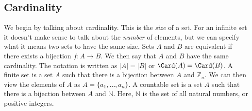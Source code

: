 \documentclass[crop=false,class=book,oneside]{standalone}
\begin{document}
        \subsection{Cardinality}
            We begin by talking about cardinality. This is the
            \textit{size} of a set. For an infinite set it
            doesn't make sense to talk about the \textit{number}
            of elements, but we can specify what it means two sets
            to have the same size. Sets $A$ and $B$ are equivalent
            if there exists a bijection $f:A\rightarrow{B}$.
            We then say that $A$ and $B$ have the same cardinality.
            The notation is written as $|A|=|B|$ or
            $\Card(A)=\Card(B)$. A finite set is a set $A$ such that
            there is a bijection between $A$ and $\mathbb{Z}_{n}$.
            We can then view the elements of $A$ as
            $A=\{a_{1},\hdots,a_{n}\}$. A countable set is a set
            $A$ such that there is a bijection between $A$ and
            $\mathbb{N}$. Here, $\mathbb{N}$ is the set of all
            natural numbers, or positive integers.
\end{document}
